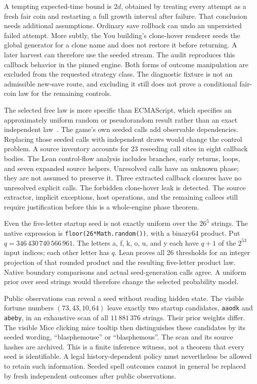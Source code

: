 \documentclass[11pt,a4paper]{article}
\numberwithin{equation}{section}
\theoremstyle{definition}
\theoremstyle{remark}
\begin{document}
A tempting expected-time bound is $2d$, obtained by treating every attempt as a fresh fair coin and restarting a full growth interval after failure. That conclusion needs additional assumptions. Ordinary save rollback can undo an unpersisted failed attempt. More subtly, the You building's clone-hover renderer seeds the global generator for a clone name and does not restore it before returning. A later harvest can therefore use the seeded stream. The audit reproduces this callback behavior in the pinned engine. Both forms of outcome manipulation are excluded from the requested strategy class. The diagnostic fixture is not an admissible new-save route, and excluding it still does not prove a conditional fair-coin law for the remaining controls.

The selected free law is more specific than ECMAScript, which specifies an approximately uniform random or pseudorandom result rather than an exact independent law~\cite{ecmascript}. The game's own seeded calls add observable dependencies. Replacing those seeded calls with independent draws would change the control problem. A source inventory accounts for 23 reseeding call sites in eight callback bodies. The Lean control-flow analysis includes branches, early returns, loops, and seven expanded source helpers. Unresolved calls have an unknown phase; they are not assumed to preserve it. Three extracted callback closures have no unresolved explicit calls. The forbidden clone-hover leak is detected. The source extractor, implicit exceptions, host operations, and the remaining callees still require justification before this is a whole-engine phase theorem.

Even the five-letter startup seed is not exactly uniform over the $26^5$ strings. The native expression is \texttt{floor(26*Math.random())}, with a binary64 product. Put $q=346\,430\,740\,566\,961$. The letters a, f, k, o, u, and y each have $q+1$ of the $2^{53}$ input indices; each other letter has $q$. Lean proves all 26 thresholds for an integer projection of that rounded product and the resulting five-letter product law. Native boundary comparisons and actual seed-generation calls agree. A uniform prior over seed strings would therefore change the selected probability model.

Public observations can reveal a seed without reading hidden state. The visible fortune numbers $(73,43,10,64)$ leave exactly two startup candidates, \texttt{aaodk} and \texttt{abeby}, in an exhaustive scan of all $11\,881\,376$ strings. Their prior weights differ. The visible Mice clicking mice tooltip then distinguishes these candidates by its seeded wording, ``blasphemouse'' or ``blasphemous''. The scan and its source hashes are archived. This is a finite inference witness, not a theorem that every seed is identifiable. A legal history-dependent policy must nevertheless be allowed to retain such information. Seeded spell outcomes cannot in general be replaced by fresh independent outcomes after public observations.
\end{document}
